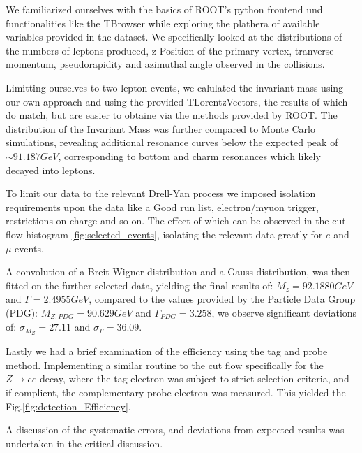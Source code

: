 \documentclass[11 pt]{article}
\begin{document}
We familiarized ourselves with the basics of ROOT's python frontend und functionalities like the TBrowser while exploring the plathera of available variables provided in the dataset.
We specifically looked at the distributions of the numbers of leptons produced, z-Position of the primary vertex, tranverse momentum, pseudorapidity and azimuthal angle observed in the collisions.

Limitting ourselves to two lepton events, we calulated the invariant mass using our own approach and using the provided TLorentzVectors, the results of which do match, but are easier to obtaine via the methods provided by ROOT.
The distribution of the Invariant Mass was further compared to Monte Carlo simulations, revealing additional resonance curves below the expected peak of $\sim 91.187GeV$, corresponding to bottom and charm resonances which likely decayed into leptons. 

To limit our data to the relevant Drell-Yan process we imposed isolation requirements upon the data like a Good run list, electron/myuon trigger, restrictions on charge and so on. The effect of which can be observed in the cut flow histogram \ref{fig:selected_events}, isolating the relevant data greatly for $e$ and $\mu$ events. 

A convolution of a Breit-Wigner distribution and a Gauss distribution, was then fitted on the further selected data, yielding the final results of: $M_{z} = 92.1880 GeV$ and $\Gamma = 2.4955 GeV$, compared to the values provided by the Particle Data Group (PDG): $M_{Z,PDG} = 90.629 GeV$ and $\Gamma_{PDG} = 3.258$, we observe significant deviations of: $\sigma_{M_Z} = 27.11$ and $\sigma_{\Gamma}=36.09$.

 Lastly we had a brief examination of the efficiency using the tag and probe method. Implementing a similar routine to the cut flow specifically for the $Z \rightarrow e e$ decay, where the tag electron was subject to strict selection criteria, and if complient, the complementary probe electron was measured. This yielded the Fig.\ref*{fig:detection_Efficiency}.
 
 A discussion of the systematic errors, and deviations from expected results was undertaken in the critical discussion.
 
 

 
\end{document}
